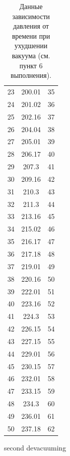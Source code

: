 \documentclass[a4paper,12pt]{article}
\begin{document}
\begin{table}[H]
\begin{minipage}[t]{.45\linewidth}
\begin{center}
\begin{tabular}{c|cc}
    23&200.01&35\\
    24&201.02&36\\
    25&202.16&37\\
    26&204.04&38\\
    27&205.01&39\\
    28&206.17&40\\
    29&207.3&41\\
    30&209.16&42\\
    31&210.3&43\\
    32&211.3&44\\
    33&213.16&45\\
    34&215.02&46\\
    35&216.17&47\\
    36&217.18&48\\
    37&219.01&49\\
    38&220.16&50\\
    39&222.01&51\\
    40&223.16&52\\
    41&224.3&53\\
    42&226.15&54\\
    43&227.15&55\\
    44&229.01&56\\
    45&230.15&57\\
    46&232.01&58\\
    47&233.15&59\\
    48&234.3&60\\
    49&236.01&61\\
    50&237.18&62\\
    \end{tabular}
    \end{center}
    \caption{second devacuuming\label{table:second devacuuming}}
  \end{minipage}
  \caption{Данные зависимости давления от времени при ухудшении вакуума (см. пункт 6 выполнения).\label{table:1 and 2}}
  \end{table}
  
\end{document}
